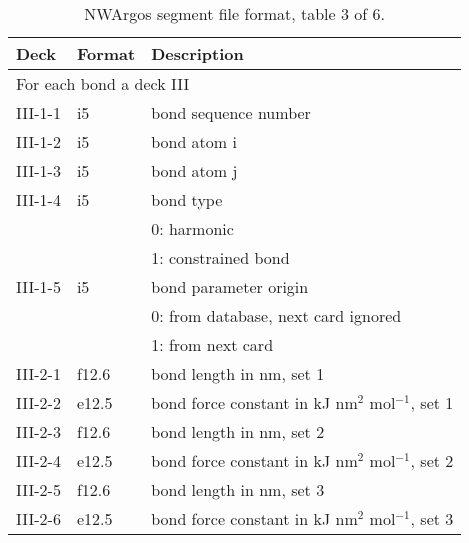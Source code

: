 \begin{table}[htbp]
\center

\label{tbl:nwaseg3}

\begin{tabular*}{150mm}{p{12mm}p{12mm}l}
\hline\hline
Deck & Format & Description \\ \hline
\multicolumn{3}{l}{For each bond a deck III} \\
III-1-1 & i5     & bond sequence number \\
III-1-2 & i5     & bond atom i \\
III-1-3 & i5     & bond atom j \\
III-1-4 & i5     & bond type \\
        &        & 0: harmonic\\
        &        & 1: constrained bond\\
III-1-5 & i5     & bond parameter origin\\
        &        & 0: from database, next card ignored \\
        &        & 1: from next card\\
III-2-1 & f12.6  & bond length in nm, set 1\\
III-2-2 & e12.5  & bond force constant in kJ nm$^2$ mol$^{-1}$, set 1 \\
III-2-3 & f12.6  & bond length in nm, set 2\\
III-2-4 & e12.5  & bond force constant in kJ nm$^2$ mol$^{-1}$, set 2 \\
III-2-5 & f12.6  & bond length in nm, set 3\\
III-2-6 & e12.5  & bond force constant in kJ nm$^2$ mol$^{-1}$, set 3 \\
\hline
\end{tabular*}

\caption{NWArgos segment file format, table 3 of 6.}

\end{table}

